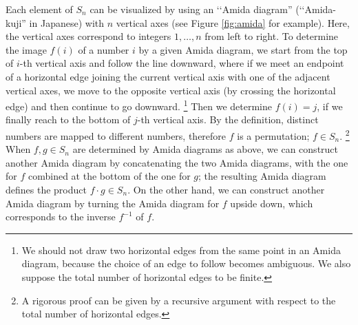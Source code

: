\documentclass[11pt]{article}
\begin{document}
Each element of $S_n$ can be visualized by using an \lq\lq Amida diagram'' (\lq\lq Amida-kuji'' in Japanese) with $n$ vertical axes (see Figure \ref{fig:amida} for example).
Here, the vertical axes correspond to integers $1,\dots,n$ from left to right.
To determine the image $f(i)$ of a number $i$ by a given Amida diagram, we start from the top of $i$-th vertical axis and follow the line downward, where if we meet an endpoint of a horizontal edge joining the current vertical axis with one of the adjacent vertical axes, we move to the opposite vertical axis (by crossing the horizontal edge) and then continue to go downward.%
\footnote{We should not draw two horizontal edges from the same point in an Amida diagram, because the choice of an edge to follow becomes ambiguous.
We also suppose the total number of horizontal edges to be finite.}
Then we determine $f(i) = j$, if we finally reach to the bottom of $j$-th vertical axis.
By the definition, distinct numbers are mapped to different numbers, therefore $f$ is a permutation; $f \in S_n$.%
\footnote{A rigorous proof can be given by a recursive argument with respect to the total number of horizontal edges.}
When $f,g \in S_n$ are determined by Amida diagrams as above, we can construct another Amida diagram by concatenating the two Amida diagrams, with the one for $f$ combined at the bottom of the one for $g$; the resulting Amida diagram defines the product $f \cdot g \in S_n$.
On the other hand, we can construct another Amida diagram by turning the Amida diagram for $f$ upside down, which corresponds to the inverse $f^{-1}$ of $f$.
\end{document}
